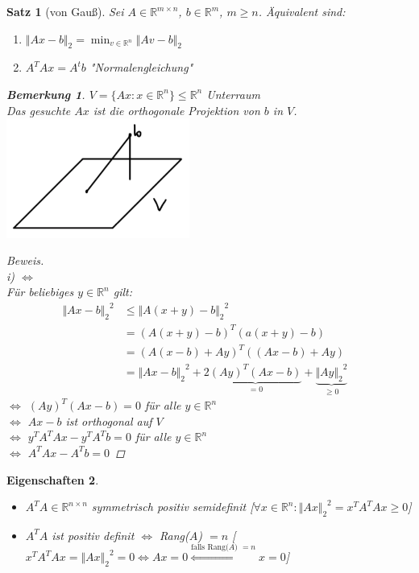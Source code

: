 \documentclass[12pt]{article}
\theoremstyle{break}
\newtheorem{theorem}{Satz}[subsection]
\newtheorem*{comment*}{Bemerkung}
\newtheorem{properties}[theorem]{Eigenschaften}
\begin{document}
\begin{theorem}[von Gauß]
Sei $A \in \mathbb{R}^{m \times n}$, $b \in \mathbb{R}^m$, $m \geq n$. Äquivalent sind:
\renewcommand{\labelenumi}{\roman{enumi})}
\begin{enumerate}
  \item $\Vert Ax - b \Vert_2 = \min_{v \in \mathbb{R}^n} \Vert Av - b \Vert_2$
  \item $A^TAx = A^tb$ "Normalengleichung"
\end{enumerate}

\begin{comment*}
$V = \{Ax: x \in \mathbb{R}^n \} \leq \mathbb{R}^n$ Unterraum\\
Das gesuchte $Ax$ ist die orthogonale Projektion von $b$ in $V$.\\
\includegraphics[width=6cm]{Bild7.png}
\end{comment*}
\begin{proof}[Beweis]\leavevmode \\
i) $\Leftrightarrow$ \\
Für beliebiges $y \in \mathbb{R}^n$ gilt:
\begin{align*}
{\Vert Ax - b \Vert_2}^2 &\leq {\Vert A(x+y) - b \Vert_2}^2 &\\
&= (A(x+y)-b)^T(a(x+y)-b) &\\
&= (A(x-b)+Ay)^T((Ax-b) + Ay) &\\
&= {\Vert Ax - b \Vert_2}^2 + 2\underbrace{(Ay)^T (Ax-b)}_{=0} + \underbrace{{\Vert Ay \Vert_2}^2}_{\geq 0} 
\end{align*}
$\Leftrightarrow$ $(Ay)^T(Ax-b) = 0$ für alle $y \in \mathbb{R}^n$ \\
$\Leftrightarrow$ $Ax-b$ ist orthogonal auf $V$ \\
$\Leftrightarrow$ $y^TA^TAx -y^TA^Tb = 0$ für alle $y \in \mathbb{R}^n$ \\
$\Leftrightarrow$ $A^TAx - A^Tb = 0$ 
\end{proof}
\end{theorem}

\begin{properties}\leavevmode
\begin{itemize}
  \item $A^TA \in \mathbb{R}^{n \times n}$ symmetrisch positiv semidefinit [$\forall x \in \mathbb{R}^n: {\Vert Ax \Vert_2}^2 = x^TA^TAx \geq 0$]
  \item $A^TA$ ist positiv definit $\Leftrightarrow$ Rang($A$) $= n$  [$x^TA^TAx = {\Vert Ax \Vert_2}^2 = 0 \Leftrightarrow Ax = 0 \overset{\text{falls Rang($A$) $=n$}}{ \Leftrightarrow} x = 0$]
\end{itemize}
\end{properties}
\end{document}
